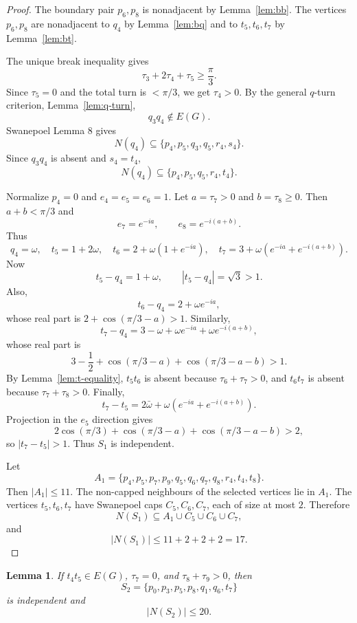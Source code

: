 \documentclass[11pt]{article}
\newtheorem{lemma}[theorem]{Lemma}
\begin{document}
\begin{proof}
The boundary pair $p_6,p_8$ is nonadjacent by Lemma~\ref{lem:bb}. The vertices $p_6,p_8$ are nonadjacent to $q_4$ by Lemma~\ref{lem:bq} and to $t_5,t_6,t_7$ by Lemma~\ref{lem:bt}.

The unique break inequality gives
\[
 \tau_3+2\tau_4+\tau_5\ge\frac{\pi}{3}.
\]
Since $\tau_5=0$ and the total turn is $<\pi/3$, we get $\tau_4>0$. By the general $q$-turn criterion, Lemma~\ref{lem:q-turn},
\[
 q_3q_4\notin E(G).
\]
Swanepoel Lemma 8 gives
\[
 N(q_4)\subseteq\{p_4,p_5,q_3,q_5,r_4,s_4\}.
\]
Since $q_3q_4$ is absent and $s_4=t_4$,
\[
 N(q_4)\subseteq\{p_4,p_5,q_5,r_4,t_4\}.
\]

Normalize $p_4=0$ and $e_4=e_5=e_6=1$. Let $a=\tau_7>0$ and $b=\tau_8\ge0$. Then $a+b<\pi/3$ and
\[
 e_7=e^{-ia},
 \qquad
 e_8=e^{-i(a+b)}.
\]
Thus
\[
 q_4=\omega,
 \quad
 t_5=1+2\omega,
 \quad
 t_6=2+\omega(1+e^{-ia}),
 \quad
 t_7=3+\omega(e^{-ia}+e^{-i(a+b)}).
\]
Now
\[
 t_5-q_4=1+\omega,
 \qquad |t_5-q_4|=\sqrt3>1.
\]
Also,
\[
 t_6-q_4=2+\omega e^{-ia},
\]
whose real part is $2+\cos(\pi/3-a)>1$. Similarly,
\[
 t_7-q_4=3-\omega+\omega e^{-ia}+\omega e^{-i(a+b)},
\]
whose real part is
\[
 3-\frac12+\cos(\pi/3-a)+\cos(\pi/3-a-b)>1.
\]
By Lemma~\ref{lem:t-equality}, $t_5t_6$ is absent because $\tau_6+\tau_7>0$, and $t_6t_7$ is absent because $\tau_7+\tau_8>0$.
Finally,
\[
 t_7-t_5=2\bar\omega+\omega(e^{-ia}+e^{-i(a+b)}).
\]
Projection in the $e_5$ direction gives
\[
2\cos(\pi/3)+\cos(\pi/3-a)+\cos(\pi/3-a-b)>2,
\]
so $|t_7-t_5|>1$. Thus $S_1$ is independent.

Let
\[
 A_1=\{p_4,p_5,p_7,p_9,q_5,q_6,q_7,q_8,r_4,t_4,t_8\}.
\]
Then $|A_1|\le11$. The non-capped neighbours of the selected vertices lie in $A_1$. The vertices $t_5,t_6,t_7$ have Swanepoel caps $C_5,C_6,C_7$, each of size at most $2$. Therefore
\[
 N(S_1)\subseteq A_1\cup C_5\cup C_6\cup C_7,
\]
and
\[
 |N(S_1)|\le11+2+2+2=17.
\]
\end{proof}

\begin{lemma}\label{lem:S2}
If $t_4t_5\in E(G)$, $\tau_7=0$, and $\tau_8+\tau_9>0$, then
\[
 S_2=\{p_0,p_3,p_5,p_8,q_1,q_6,t_7\}
\]
is independent and
\[
 |N(S_2)|\le20.
\]
\end{lemma}
\end{document}
